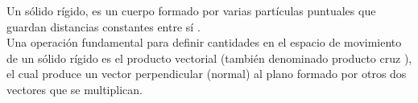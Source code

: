 \newpage
{}
\label{anexoA}
\noindent Un sólido rígido, es un cuerpo formado por varias partículas puntuales que
guardan distancias constantes entre sí \citep{sears2005fisica}.\\

Una operación fundamental para definir cantidades en el espacio de movimiento de
un sólido rígido es el producto vectorial (también denominado producto cruz \citep{stanley1993algebra}),
el cual produce un vector perpendicular (normal) al plano formado por otros dos vectores
que se multiplican.\\

